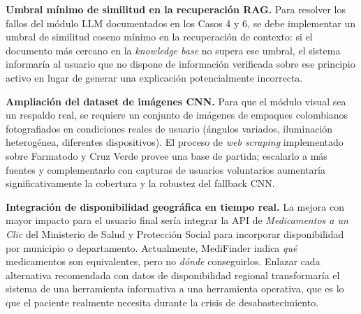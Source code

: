 \textbf{Umbral mínimo de similitud en la recuperación RAG.} Para resolver los fallos del módulo LLM documentados en los Casos 4 y 6, se debe implementar un umbral de similitud coseno mínimo en la recuperación de contexto: si el documento más cercano en la \textit{knowledge base} no supera ese umbral, el sistema informaría al usuario que no dispone de información verificada sobre ese principio activo en lugar de generar una explicación potencialmente incorrecta.

\textbf{Ampliación del dataset de imágenes CNN.} Para que el módulo visual sea un respaldo real, se requiere un conjunto de imágenes de empaques colombianos fotografiados en condiciones reales de usuario (ángulos variados, iluminación heterogénea, diferentes dispositivos). El proceso de \textit{web scraping} implementado sobre Farmatodo y Cruz Verde provee una base de partida; escalarlo a más fuentes y complementarlo con capturas de usuarios voluntarios aumentaría significativamente la cobertura y la robustez del fallback CNN.

\textbf{Integración de disponibilidad geográfica en tiempo real.} La mejora con mayor impacto para el usuario final sería integrar la API de \textit{Medicamentos a un Clic} del Ministerio de Salud y Protección Social para incorporar disponibilidad por municipio o departamento. Actualmente, MediFinder indica \textit{qué} medicamentos son equivalentes, pero no \textit{dónde} conseguirlos. Enlazar cada alternativa recomendada con datos de disponibilidad regional transformaría el sistema de una herramienta informativa a una herramienta operativa, que es lo que el paciente realmente necesita durante la crisis de desabastecimiento.

\pagebreak
